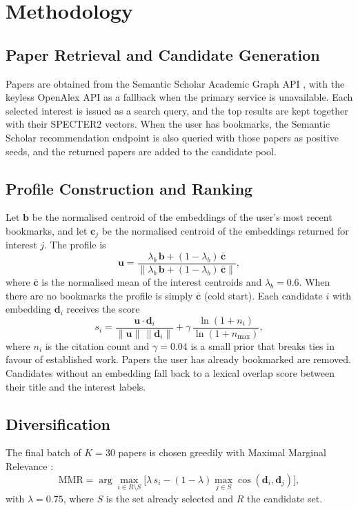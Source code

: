 \documentclass[conference]{IEEEtran}
\begin{document}
\section{Methodology}
\subsection{Paper Retrieval and Candidate Generation}
Papers are obtained from the Semantic Scholar Academic Graph API \cite{kinney2023}, with the keyless OpenAlex API as a fallback when the primary service is unavailable. Each selected interest is issued as a search query, and the top results are kept together with their SPECTER2 vectors. When the user has bookmarks, the Semantic Scholar recommendation endpoint is also queried with those papers as positive seeds, and the returned papers are added to the candidate pool.

\subsection{Profile Construction and Ranking}
Let $\mathbf{b}$ be the normalised centroid of the embeddings of the user's most recent bookmarks, and let $\mathbf{c}_j$ be the normalised centroid of the embeddings returned for interest $j$. The profile is
\begin{equation}
    \mathbf{u} = \frac{\lambda_b\,\mathbf{b} + (1-\lambda_b)\,\bar{\mathbf{c}}}{\lVert \lambda_b\,\mathbf{b} + (1-\lambda_b)\,\bar{\mathbf{c}} \rVert},
\end{equation}
where $\bar{\mathbf{c}}$ is the normalised mean of the interest centroids and $\lambda_b=0.6$. When there are no bookmarks the profile is simply $\bar{\mathbf{c}}$ (cold start). Each candidate $i$ with embedding $\mathbf{d}_i$ receives the score
\begin{equation}
    s_i = \frac{\mathbf{u}\cdot\mathbf{d}_i}{\lVert\mathbf{u}\rVert\,\lVert\mathbf{d}_i\rVert} + \gamma\,\frac{\ln(1+n_i)}{\ln(1+n_{\max})},
\end{equation}
where $n_i$ is the citation count and $\gamma=0.04$ is a small prior that breaks ties in favour of established work. Papers the user has already bookmarked are removed. Candidates without an embedding fall back to a lexical overlap score between their title and the interest labels.

\subsection{Diversification}
The final batch of $K=30$ papers is chosen greedily with Maximal Marginal Relevance \cite{carbonell1998}:
\begin{equation}
    \mathrm{MMR} = \arg\max_{i \in R\setminus S}\Big[\lambda\, s_i - (1-\lambda)\max_{j\in S}\cos(\mathbf{d}_i,\mathbf{d}_j)\Big],
\end{equation}
with $\lambda=0.75$, where $S$ is the set already selected and $R$ the candidate set.
\end{document}

